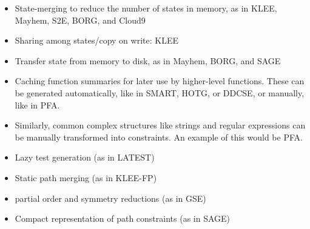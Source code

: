\documentclass{article}
\begin{document}
\begin{multicols}{2}
\begin{itemize}
        \item State-merging to reduce the number of states in memory, as in KLEE\cite{KLEE}, Mayhem\cite{Mayhem}, S2E\cite{S2E}, BORG\cite{BORG}, and Cloud9\cite{Cloud9}
        \item Sharing among states/copy on write: KLEE\cite{KLEE}
        \item Transfer state from memory to disk, as in Mayhem\cite{Mayhem}, BORG\cite{BORG}, and SAGE\cite{SAGE}
        \item Caching function summaries for later use by higher-level functions. These can be generated automatically, like in SMART\cite{SMART}, HOTG\cite{HigherOrderTestGeneration}, or DDCSE\cite{DDCSE}, or manually, like in PFA\cite{PFA}.
        \item Similarly, common complex structures like strings and regular expressions can be manually transformed into constraints. An example of this would be PFA\cite{PFA}.
        \item Lazy test generation (as in LATEST\cite{LATEST})
        \item Static path merging (as in KLEE-FP\cite{KLEEFP})
        \item partial order and symmetry reductions (as in GSE\cite{GSE})
        \item Compact representation of path constraints (as in SAGE\cite{SAGE})
    \end{itemize}


\end{multicols}
\end{document}
